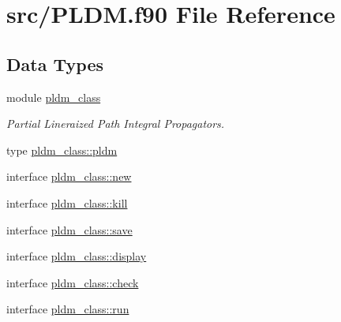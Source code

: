 \hypertarget{_p_l_d_m_8f90}{\section{src/\-P\-L\-D\-M.f90 File Reference}
\label{_p_l_d_m_8f90}
}
\subsection*{Data Types}
\begin{DoxyCompactItemize}
\item 
module \hyperlink{classpldm__class}{pldm\-\_\-class}
\begin{DoxyCompactList}\small\item\em Partial Lineraized Path Integral Propagators. \end{DoxyCompactList}\item 
type \hyperlink{structpldm__class_1_1pldm}{pldm\-\_\-class\-::pldm}
\item 
interface \hyperlink{interfacepldm__class_1_1new}{pldm\-\_\-class\-::new}
\item 
interface \hyperlink{interfacepldm__class_1_1kill}{pldm\-\_\-class\-::kill}
\item 
interface \hyperlink{interfacepldm__class_1_1save}{pldm\-\_\-class\-::save}
\item 
interface \hyperlink{interfacepldm__class_1_1display}{pldm\-\_\-class\-::display}
\item 
interface \hyperlink{interfacepldm__class_1_1check}{pldm\-\_\-class\-::check}
\item 
interface \hyperlink{interfacepldm__class_1_1run}{pldm\-\_\-class\-::run}
\end{DoxyCompactItemize}
